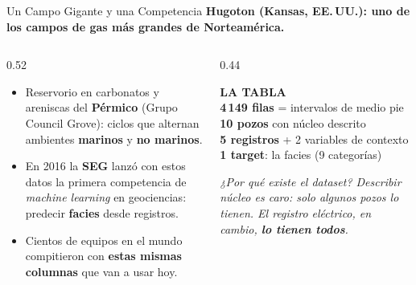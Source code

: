 \documentclass[aspectratio=169, 11pt]{beamer}
\begin{document}
\begin{frame}[shrink=8]{Un Campo Gigante y una Competencia}
  \vspace{-4pt}
  {\small\color{arcaDark}\bfseries
    Hugoton (Kansas, EE.\,UU.): uno de los campos de gas más grandes de Norteamérica.}

  \vspace{8pt}
  \begin{columns}[T]
    \begin{column}{0.52\textwidth}
      {\footnotesize\color{textMuted}
      \begin{itemize}\setlength{\itemsep}{5pt}
        \item[{\color{arcaRed}\scriptsize\faIndustry}]
          Reservorio en carbonatos y areniscas del \textbf{Pérmico}
          (Grupo Council Grove): ciclos que alternan ambientes
          \textbf{marinos} y \textbf{no marinos}.
        \item[{\color{arcaRed}\scriptsize\faTrophy}]
          En 2016 la \textbf{SEG} lanzó con estos datos la primera
          competencia de \emph{machine learning} en geociencias:
          predecir \textbf{facies} desde registros.
        \item[{\color{arcaRed}\scriptsize\faUsers}]
          Cientos de equipos en el mundo compitieron con
          \textbf{estas mismas columnas} que van a usar hoy.
      \end{itemize}
      }
    \end{column}
    \begin{column}{0.44\textwidth}
      \begin{tcolorbox}[colback=arcaGray, colframe=arcaRed, boxrule=0pt, leftrule=3pt,
        arc=3pt, left=6pt, right=6pt, top=5pt, bottom=5pt]
        {\scriptsize\color{arcaDark}\bfseries\faDatabase\hspace{4pt}LA TABLA}\\[4pt]
        {\scriptsize\color{textMuted}
          \textbf{4\,149 filas} = intervalos de medio pie\\
          \textbf{10 pozos} con núcleo descrito\\
          \textbf{5 registros} + 2 variables de contexto\\
          \textbf{1 target}: la facies (9 categorías)}
      \end{tcolorbox}
      \vspace{6pt}
      {\scriptsize\color{textMuted}\itshape
        ¿Por qué existe el dataset? Describir núcleo es caro:
        solo algunos pozos lo tienen. El registro eléctrico, en cambio,
        \textbf{lo tienen todos}.}
    \end{column}
  \end{columns}
\end{frame}
\end{document}
